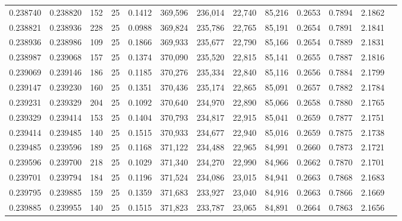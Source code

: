 \begin{tabular}{rrrrrrrrrrrrr}
0.238740 & 0.238820 &   152 &  25 &                                     0.1412 & 369,596 & 236,014 &  22,740 &  85,216 & 0.2653 & 0.7894 & 2.1862 \\
0.238821 & 0.238936 &   228 &  25 &                                     0.0988 & 369,824 & 235,786 &  22,765 &  85,191 & 0.2654 & 0.7891 & 2.1841 \\
0.238936 & 0.238986 &   109 &  25 &                                     0.1866 & 369,933 & 235,677 &  22,790 &  85,166 & 0.2654 & 0.7889 & 2.1831 \\
0.238987 & 0.239068 &   157 &  25 &                                     0.1374 & 370,090 & 235,520 &  22,815 &  85,141 & 0.2655 & 0.7887 & 2.1816 \\
0.239069 & 0.239146 &   186 &  25 &                                     0.1185 & 370,276 & 235,334 &  22,840 &  85,116 & 0.2656 & 0.7884 & 2.1799 \\
0.239147 & 0.239230 &   160 &  25 &                                     0.1351 & 370,436 & 235,174 &  22,865 &  85,091 & 0.2657 & 0.7882 & 2.1784 \\
0.239231 & 0.239329 &   204 &  25 &                                     0.1092 & 370,640 & 234,970 &  22,890 &  85,066 & 0.2658 & 0.7880 & 2.1765 \\
0.239329 & 0.239414 &   153 &  25 &                                     0.1404 & 370,793 & 234,817 &  22,915 &  85,041 & 0.2659 & 0.7877 & 2.1751 \\
0.239414 & 0.239485 &   140 &  25 &                                     0.1515 & 370,933 & 234,677 &  22,940 &  85,016 & 0.2659 & 0.7875 & 2.1738 \\
0.239485 & 0.239596 &   189 &  25 &                                     0.1168 & 371,122 & 234,488 &  22,965 &  84,991 & 0.2660 & 0.7873 & 2.1721 \\
0.239596 & 0.239700 &   218 &  25 &                                     0.1029 & 371,340 & 234,270 &  22,990 &  84,966 & 0.2662 & 0.7870 & 2.1701 \\
0.239701 & 0.239794 &   184 &  25 &                                     0.1196 & 371,524 & 234,086 &  23,015 &  84,941 & 0.2663 & 0.7868 & 2.1683 \\
0.239795 & 0.239885 &   159 &  25 &                                     0.1359 & 371,683 & 233,927 &  23,040 &  84,916 & 0.2663 & 0.7866 & 2.1669 \\
0.239885 & 0.239955 &   140 &  25 &                                     0.1515 & 371,823 & 233,787 &  23,065 &  84,891 & 0.2664 & 0.7863 & 2.1656 \\

\end{tabular}
